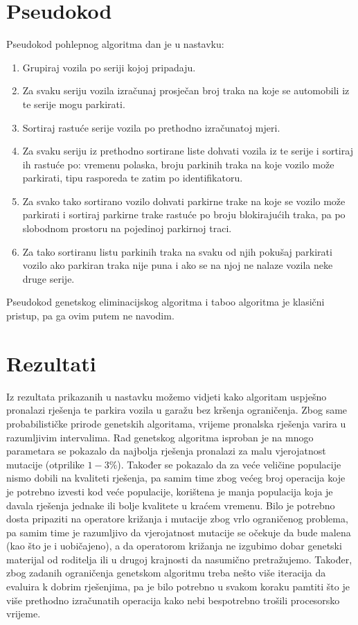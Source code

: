 \documentclass[11pt]{article}
\begin{document}
\section{Pseudokod}
Pseudokod pohlepnog algoritma dan je u nastavku:


\begin{enumerate}
  \item Grupiraj vozila po seriji kojoj pripadaju.
  \item Za svaku seriju vozila izračunaj prosječan broj traka na koje se automobili iz te serije mogu parkirati.
  \item Sortiraj rastuće serije vozila po prethodno izračunatoj mjeri.
  \item Za svaku seriju iz prethodno sortirane liste dohvati vozila iz te serije i sortiraj ih rastuće po: vremenu polaska, broju parkinih traka na koje vozilo može parkirati, tipu rasporeda te zatim po identifikatoru.
  \item Za svako tako sortirano vozilo dohvati parkirne trake na koje se vozilo može parkirati i sortiraj parkirne trake rastuće po broju blokirajućih traka, pa po slobodnom prostoru na pojedinoj parkirnoj traci.
  \item Za tako sortiranu listu parkinih traka na svaku od njih pokušaj parkirati vozilo ako parkiran traka nije puna i ako se na njoj ne nalaze vozila neke druge serije.
\end{enumerate}

Pseudokod genetskog eliminacijskog algoritma i taboo algoritma je klasični pristup, pa ga ovim putem ne navodim.


\section{Rezultati}
Iz rezultata prikazanih u nastavku možemo vidjeti kako algoritam uspješno pronalazi rješenja te parkira vozila u garažu bez kršenja ograničenja. Zbog same probabilističke prirode genetskih algoritama, vrijeme pronalska rješenja varira u razumljivim intervalima. Rad genetskog algoritma isproban je na mnogo parametara se pokazalo da najbolja rješenja pronalazi za malu vjerojatnost mutacije (otprilike $1-3\%$). Također se pokazalo da za veće veličine populacije nismo dobili na kvaliteti rješenja, pa samim time zbog većeg broj operacija koje je potrebno izvesti kod veće populacije, korištena je manja populacija koja je davala rješenja jednake ili bolje kvalitete u kraćem vremenu. Bilo je potrebno dosta pripaziti na operatore križanja i mutacije zbog vrlo ograničenog problema, pa samim time je razumljivo da vjerojatnost mutacije se očekuje da bude malena (kao što je i uobičajeno), a da operatorom križanja ne izgubimo dobar genetski materijal od roditelja ili u drugoj krajnosti da nasumično pretražujemo. Također, zbog zadanih ograničenja genetskom algoritmu treba nešto više iteracija da evaluira k dobrim rješenjima, pa je bilo potrebno u svakom koraku pamtiti što je više prethodno izračunatih operacija kako nebi bespotrebno trošili procesorsko vrijeme. 
\end{document}
